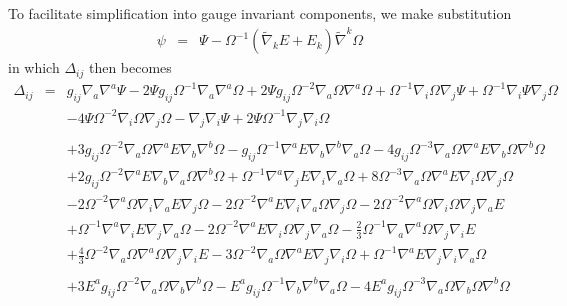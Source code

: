 \documentclass[10pt,letterpaper]{article}
\numberwithin{equation}{section}
\begin{document}
To facilitate simplification into gauge invariant components, we make substitution 
\begin{eqnarray}
\psi &=& \Psi - \Omega^{-1}(\tilde\nabla_k  E +  E_k)\tilde\nabla^k \Omega
\end{eqnarray}
in which $\Delta_{ij}$ then becomes
\begin{eqnarray}
\Delta_{ij}&=&g_{ij} \nabla_{a}\nabla^{a}\Psi
- 2 \Psi g_{ij} \Omega^{-1} \nabla_{a}\nabla^{a}\Omega
+ 2 \Psi g_{ij} \Omega^{-2} \nabla_{a}\Omega \nabla^{a}\Omega
+ \Omega^{-1} \nabla_{i}\Omega \nabla_{j}\Psi
+ \Omega^{-1} \nabla_{i}\Psi \nabla_{j}\Omega\nonumber\\
&& - 4 \Psi \Omega^{-2} \nabla_{i}\Omega \nabla_{j}\Omega
-  \nabla_{j}\nabla_{i}\Psi
+ 2 \Psi \Omega^{-1} \nabla_{j}\nabla_{i}\Omega
\label{Dgs1} \\
\nonumber\\
&&
+3 g_{ij} \Omega^{-2} \nabla_{a}\Omega \nabla^{a}E \nabla_{b}\nabla^{b}\Omega
-  g_{ij} \Omega^{-1} \nabla^{a}E \nabla_{b}\nabla^{b}\nabla_{a}\Omega
- 4 g_{ij} \Omega^{-3} \nabla_{a}\Omega \nabla^{a}E \nabla_{b}\Omega \nabla^{b}\Omega\nonumber\\
&& + 2 g_{ij} \Omega^{-2} \nabla^{a}E \nabla_{b}\nabla_{a}\Omega \nabla^{b}\Omega
+ \Omega^{-1} \nabla^{a}\nabla_{j}E \nabla_{i}\nabla_{a}\Omega
+ 8 \Omega^{-3} \nabla_{a}\Omega \nabla^{a}E \nabla_{i}\Omega \nabla_{j}\Omega\nonumber\\
&& - 2 \Omega^{-2} \nabla^{a}\Omega \nabla_{i}\nabla_{a}E \nabla_{j}\Omega
- 2 \Omega^{-2} \nabla^{a}E \nabla_{i}\nabla_{a}\Omega \nabla_{j}\Omega
- 2 \Omega^{-2} \nabla^{a}\Omega \nabla_{i}\Omega \nabla_{j}\nabla_{a}E\nonumber\\
&& + \Omega^{-1} \nabla^{a}\nabla_{i}E \nabla_{j}\nabla_{a}\Omega
- 2 \Omega^{-2} \nabla^{a}E \nabla_{i}\Omega \nabla_{j}\nabla_{a}\Omega
-  \tfrac{2}{3} \Omega^{-1} \nabla_{a}\nabla^{a}\Omega \nabla_{j}\nabla_{i}E\nonumber\\
&& + \tfrac{4}{3} \Omega^{-2} \nabla_{a}\Omega \nabla^{a}\Omega \nabla_{j}\nabla_{i}E
- 3 \Omega^{-2} \nabla_{a}\Omega \nabla^{a}E \nabla_{j}\nabla_{i}\Omega
+ \Omega^{-1} \nabla^{a}E \nabla_{j}\nabla_{i}\nabla_{a}\Omega
\label{Dgs2} \\
\nonumber\\
&&+3 E^{a} g_{ij} \Omega^{-2} \nabla_{a}\Omega \nabla_{b}\nabla^{b}\Omega
-  E^{a} g_{ij} \Omega^{-1} \nabla_{b}\nabla^{b}\nabla_{a}\Omega
- 4 E^{a} g_{ij} \Omega^{-3} \nabla_{a}\Omega \nabla_{b}\Omega \nabla^{b}\Omega\nonumber\\

\end{eqnarray}
\end{document}

